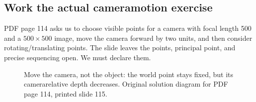 \documentclass[letterpaper,11pt,english,openany,oneside]{jupyterBook}
\begin{document}
\subsection{Work the actual camera\sphinxhyphen{}motion exercise}
\label{\detokenize{lectures/lecture01/cameras:work-the-actual-camera-motion-exercise}}
\sphinxAtStartPar
PDF page 114 asks us to choose visible points for a camera with focal length 500 and a \(500\times500\) image, move the camera forward by two units, and then consider rotating/translating points. The slide leaves the points, principal point, and precise sequencing open. We must declare them.

\begin{figure}[H]
\centering
\capstart

\noindent{}
\caption{Move the camera, not the object: the world point stays fixed, but its camera\sphinxhyphen{}relative depth decreases. Original solution diagram for PDF page 114, printed slide 115.}\label{\detokenize{lectures/lecture01/cameras:fig-lec01-camera-motion}}\end{figure}
\label{\detokenize{lectures/lecture01/cameras:ex-lec01-camera-motion}}
\end{document}

